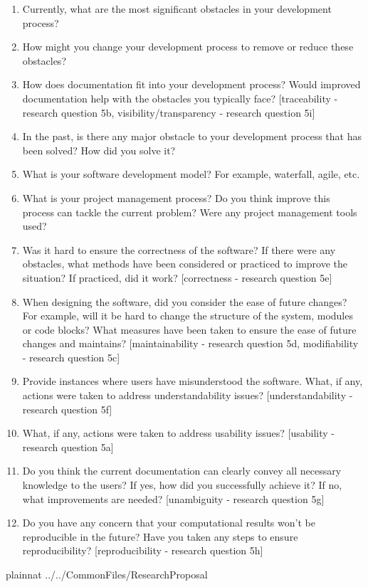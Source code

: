 \documentclass[letterpaper,cleveref]{lipics-v2019}
\begin{document}
\begin{enumerate}
\item Currently, what are the most significant obstacles in your development
process?
\item How might you change your development process to remove or reduce these
obstacles?
\item How does documentation fit into your development process? Would improved
documentation help with the obstacles you typically face? [traceability -
research question 5b, visibility/transparency - research question 5i]
\item In the past, is there any major obstacle to your development process that
has been solved? How did you solve it?
\item What is your software development model? For example, waterfall, agile,
etc.
\item What is your project management process? Do you think improve this process
can tackle the current problem? Were any project management tools used?
\item Was it hard to ensure the correctness of the software? If there were any
 obstacles, what methods have been considered or practiced to improve the
 situation? If practiced, did it work? [correctness - research question 5e]
\item When designing the software, did you consider the ease of future changes?
 For example, will it be hard to change the structure of the system, modules or
 code blocks? What measures have been taken to ensure the ease of future changes
 and maintains? [maintainability - research question 5d, modifiability -
 research question 5c]
\item Provide instances where users have misunderstood the software. What, if
any, actions were taken to address understandability issues? [understandability
- research question 5f]
\item What, if any, actions were taken to address usability issues? [usability -
research question 5a]
\item Do you think the current documentation can clearly convey all necessary
knowledge to the users? If yes, how did you successfully achieve it? If no, what
improvements are needed? [unambiguity - research question 5g]
\item Do you have any concern that your computational results won't be
reproducible in the future? Have you taken any steps to ensure reproducibility?
[reproducibility - research question 5h]
\end{enumerate}

\newpage

 {plainnat}
 {../../CommonFiles/ResearchProposal}
\end{document}
